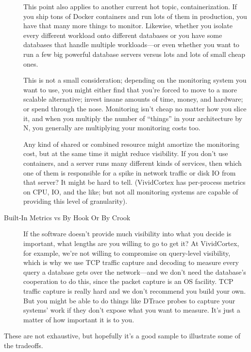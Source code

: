 \documentclass{vivid_layout}
\begin{document}
\begin{description}
This point also applies to another current hot topic, containerization. If you
ship tons of Docker containers and run lots of them in production, you have that
many more things to monitor. Likewise, whether you isolate every different
workload onto different databases or you have some databases that handle
multiple workloads---or even whether you want to run a few big powerful database
servers versus lots and lots of small cheap ones.

This is not a small consideration; depending on the monitoring system you want
to use, you might either find that you're forced to move to a more scalable
alternative; invest insane amounts of time, money, and hardware; or spend
through the nose. Monitoring isn't cheap no matter how you slice it, and when
you multiply the number of ``things'' in your architecture by N, you generally
are multiplying your monitoring costs too.

Any kind of shared or combined resource might amortize the monitoring cost, but
at the same time it might reduce visibility. If you don't use containers, and a
server runs many different kinds of services, then which one of them is
responsible for a spike in network traffic or disk IO from that server? It might
be hard to tell. (VividCortex has per-process metrics on CPU, IO, and the like;
but not all monitoring systems are capable of providing this level of
granularity).

\item[Built-In Metrics vs By Hook Or By Crook] If the software doesn't provide
much visibility into what you decide is important, what lengths are you willing
to go to get it? At VividCortex, for example, we're not willing to compromise on
query-level visibility, which is why we use TCP traffic capture and decoding to
measure every query a database gets over the network---and we don't need the
database's cooperation to do this, since the packet capture is an OS facility.
TCP traffic capture is really hard and we don't recommend you build your own.
But you might be able to do things like DTrace probes to capture your systems'
work if they don't expose what you want to measure. It's just a matter of how
important it is to you.

\end{description}

These are not exhaustive, but hopefully it's a good sample to illustrate some of
the tradeoffs.
\end{document}
